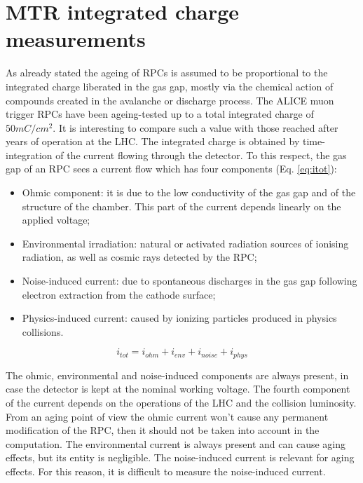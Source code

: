 \section{MTR integrated charge measurements}
\label{currents}
As already stated the ageing of RPCs is assumed to be proportional to the integrated charge liberated in the gas gap, mostly via the chemical action of compounds created in the avalanche or discharge process.
The ALICE muon trigger RPCs  have been ageing-tested up to a total integrated charge of $50 mC/cm^2$. 
It is interesting to compare such a value with those reached after years of operation at the LHC.
The integrated charge is obtained by time-integration of the current flowing through the detector. 
To this respect, the gas gap of an RPC sees a current flow which has four components (Eq. \ref{eq:itot}):
\begin{itemize}
\item Ohmic component: it is due to the low conductivity of the gas gap and of the structure of the chamber. This part of the current depends linearly on the applied voltage;
\item Environmental irradiation: natural or activated radiation sources of ionising radiation, as well as cosmic rays detected by the RPC;
\item Noise-induced current: due to spontaneous discharges in the gas gap following electron extraction from the cathode surface;
\item Physics-induced current: caused by ionizing particles produced in physics collisions.
\end{itemize}

\begin{equation}
\label{eq:itot}
i_{tot}=i_{ohm}+i_{env}+i_{noise}+i_{phys}
\end{equation}

The ohmic, environmental and noise-induced components are always present, in case the detector is kept at the nominal working voltage.
The fourth component of the current depends on the operations of the LHC and the collision luminosity.
From an aging point of view the ohmic current won't cause any permanent modification of the RPC, then it should not be taken into account in the computation.
The environmental current is always present and can cause aging effects, but its entity is negligible.
The noise-induced current is relevant for aging effects.
For this reason, it is difficult to measure the noise-induced current.

